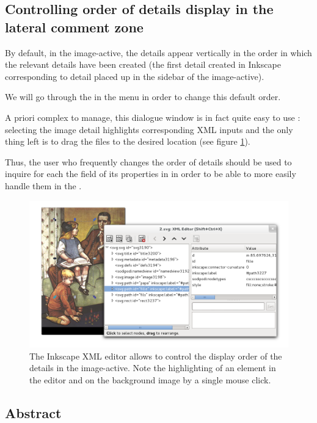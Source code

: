 \subsection{Controlling order of details display in the lateral comment zone}

By default, in the image-active, the details appear vertically in the order in which the relevant details have been created (the first detail created in Inkscape corresponding to detail placed up in the sidebar of the image-active).

We will go through the  in the  menu in order to change this default order.

A priori complex to manage, this dialogue window is in fact quite easy to use : selecting the image detail highlights corresponding XML inputs and the only thing left is to drag the files to the desired location (see figure \ref{ordre_couches}).

Thus, the user who frequently changes the order of details should be used to inquire for each the field  of its properties in in order to be able to more easily handle them in the .


\begin{figure}[htp]
 \centering
 \includegraphics[width=\textwidth]{images/ordre_couches}
 \caption{The Inkscape XML editor allows to control the display order of the details in the image-active. Note the highlighting of an element  
in the editor and on the background image by a single mouse click.}
 \label{ordre_couches}
\end{figure}

\subsection{Abstract}

